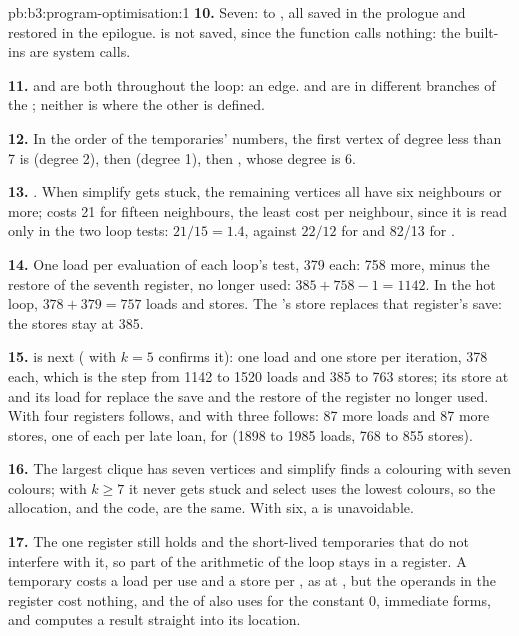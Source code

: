 \begin{solution}{pb:b3:program-optimisation:1}
\textbf{10.} Seven:  to , all saved in the prologue and restored in the epilogue.  is not saved, since the function calls nothing: the built-ins are system calls.

\textbf{11.}  and  are both  throughout the loop: an edge.  and  are in different branches of the ; neither is  where the other is defined.

\textbf{12.} In the order of the temporaries' numbers, the first vertex of degree less than 7 is  (degree 2), then  (degree 1), then , whose degree is 6.

\textbf{13.} . When simplify gets stuck, the remaining vertices all have six neighbours or more;  costs 21 for fifteen neighbours, the least cost per neighbour, since it is read only in the two loop tests: $21/15 = 1.4$, against $22/12$ for  and 82/13 for .

\textbf{14.} One load per evaluation of each loop's test, 379 each: 758 more, minus the restore of the seventh  register, no longer used: $385 + 758 - 1 = 1142$. In the hot loop, $378 + 379 = 757$ loads and stores. The 's store replaces that register's save: the stores stay at 385.

\textbf{15.}  is  next ( with $k = 5$ confirms it): one load and one store per iteration, 378 each, which is the step from 1142 to 1520 loads and 385 to 763 stores; its store at  and its load for  replace the save and the restore of the register no longer used. With four registers  follows, and with three  follows: 87 more loads and 87 more stores, one of each per late loan, for  (1898 to 1985 loads, 768 to 855 stores).

\textbf{16.} The largest clique has seven vertices and simplify finds a colouring with seven colours; with $k \ge 7$ it never gets stuck and select uses the lowest colours, so the allocation, and the code, are the same. With six, a  is unavoidable.

\textbf{17.} The one register still holds  and the short-lived temporaries that do not interfere with it, so part of the arithmetic of the loop stays in a register. A  temporary costs a load per use and a store per , as at , but the operands in the register cost nothing, and the  of  also uses  for the constant 0, immediate forms, and computes a result straight into its location.


\end{solution}
